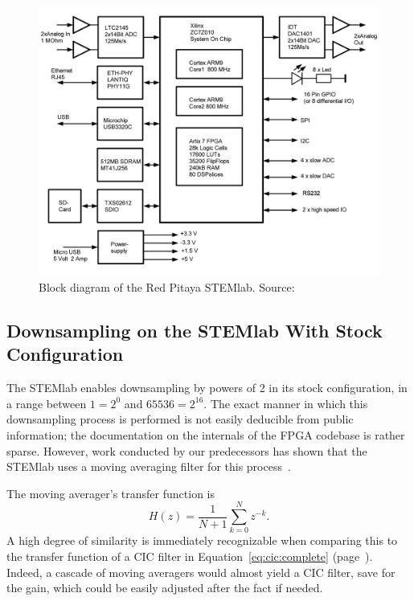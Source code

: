 \begin{figure}
    \centering
    \includegraphics[width=\textwidth]{images/stl125/stemlab125.png}
    \caption{Block diagram of the Red Pitaya STEMlab. Source:~\cite{pita:ossmann}}
    \label{fig:stl125:block_diagram}
\end{figure}


\subsection{Downsampling on the STEMlab With Stock Configuration} %
\label{subsec:stl125:ds_default}

The  STEMlab  enables   downsampling  by  powers  of  \num{2}   in  its  stock
configuration, in a range  between $1 = 2^0$ and $65536  = 2^{16}$.  The exact
manner in which this downsampling process is performed is not easily deducible
from  public information;  the  documentation  on the  internals  of the  FPGA
codebase  is  rather  sparse. However,  work  conducted  by  our  predecessors
has  shown  that  the  STEMlab  uses   a  moving  averaging  filter  for  this
process~\cite{bucher:kuery}.

The moving averager's transfer function is
\begin{equation}
    \label{eq:moving_averager}
    H(z) = \frac{1}{N+1}\sum_{k = 0}^{N} z^{-k}.
\end{equation}
A high degree of similarity is immediately recognizable when comparing this to
the  transfer  function  of  a CIC  filter  in  Equation~\ref{eq:cic:complete}
(page~\pageref{eq:cic:complete}). Indeed, a cascade  of moving averagers would
almost yield a CIC  filter, save for the gain, which  could be easily adjusted
after the fact if needed.

